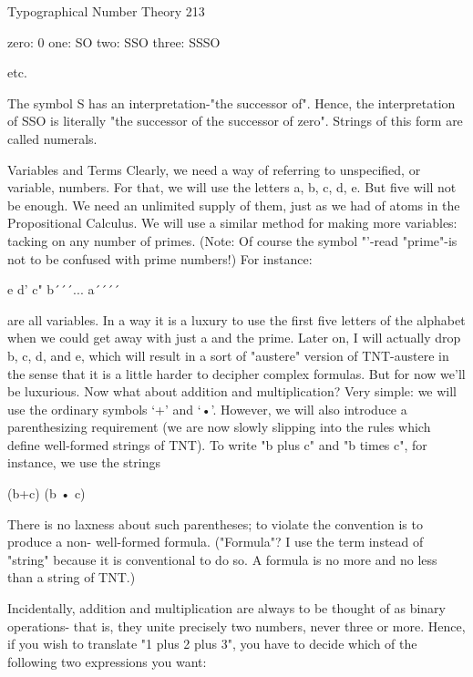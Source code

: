 Typographical Number Theory                                                             213

                  zero:               0
                  one:               SO
                  two:              SSO
                  three:           SSSO

                            etc.

The symbol S has an interpretation-"the successor of". Hence, the interpretation of SSO
is literally "the successor of the successor of zero". Strings of this form are called
numerals.

                                   Variables and Terms
Clearly, we need a way of referring to unspecified, or variable, numbers. For that, we will
use the letters a, b, c, d, e. But five will not be enough. We need an unlimited supply of
them, just as we had of atoms in the Propositional Calculus. We will use a similar method
for making more variables: tacking on any number of primes. (Note: Of course the
symbol "'-read "prime"-is not to be confused with prime numbers!) For instance:

                               e
                               d'
                               c"
                               b´´´...
                               a´´´´

are all variables.
         In a way it is a luxury to use the first five letters of the alphabet when we could
get away with just a and the prime. Later on, I will actually drop b, c, d, and e, which will
result in a sort of "austere" version of TNT-austere in the sense that it is a little harder to
decipher complex formulas. But for now we'll be luxurious.
         Now what about addition and multiplication? Very simple: we will use the
ordinary symbols `+' and `•'. However, we will also introduce a parenthesizing
requirement (we are now slowly slipping into the rules which define well-formed strings
of TNT). To write "b plus c" and "b times c", for instance, we use the strings

                                            (b+c)
                                            (b • c)

There is no laxness about such parentheses; to violate the convention is to produce a non-
well-formed formula. ("Formula"? I use the term instead of "string" because it is
conventional to do so. A formula is no more and no less than a string of TNT.)

Incidentally, addition and multiplication are always to be thought of as binary operations-
that is, they unite precisely two numbers, never three or more. Hence, if you wish to
translate "1 plus 2 plus 3", you have to decide which of the following two expressions
you want:


